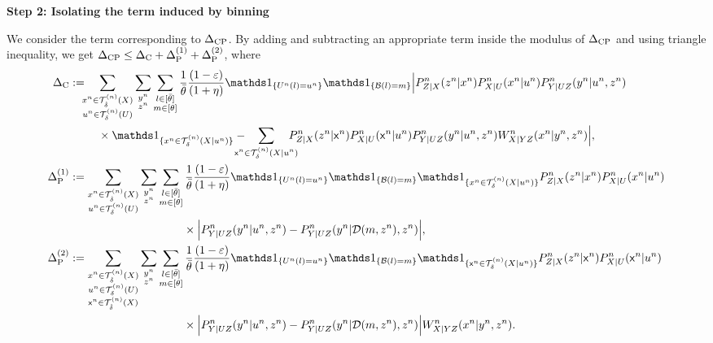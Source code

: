 \noindent \textbf{Step 2: Isolating the term induced by binning}

\noindent We consider the term corresponding to $\Delta_{\text{CP}}$. By adding and subtracting an appropriate term inside the modulus of $\Delta_{\text{CP}}$ and using triangle inequality, we get $\Delta_{\text{CP}} \leq \Delta_{\text{C}} + \Delta_{\text{P}}^{(1)} + \Delta_{\text{P}}^{(2)}$, where 
\begin{align*}
    \ce &\deq \!\!\!\sum_{\substack{\xn \in \Tx \\ \un \in \Tu }} \sum_{\substack{\yn \\ \zn}} \sum_{\substack{ l \in [\btheta]\\m\in [\theta] }} 
    \frac{1}{\btheta} \frac{(1-\varepsilon)}{(1+\eta)} 
    \I_{\set{\Un(l) = \un}} \I_{\set{\calB(l) = m}}
 \Big|P_{Z|X}^n(\zn|\xn) P_{X|U}^n(\xn|\un) P^n_{Y|UZ}(\yn|\un,\zn) \\
    & \hspace{25pt} \times \I_{\set{\xn \in \Txcond}} - \!\!\!\!\!\!\!\sum_{\substack{\sfxn \in \Txcond}} \!\!\!\!\!\!P_{Z|X}^n(\zn|\sfxn) P_{X|U}^n(\sfxn|\un) P^n_{Y|UZ}(\yn|\un,\zn) W^n_{X|YZ}(\xn
    |\yn,\zn)
    \Big|,\\
    \peone &\deq \sum_{\substack{\xn \in \Tx \\ \un \in \Tu }} \sum_{\substack{\yn \\ \zn}} \sum_{\substack{ l \in [\btheta]\\m\in [\theta] }} 
    \frac{1}{\btheta} \frac{(1-\varepsilon)}{(1+\eta)} 
    \I_{\set{\Un(l) = \un}} \I_{\set{\calB(l) = m}} \I_{\set{\xn \in \Txcond}}
    P_{Z|X}^n(\zn|\xn) P_{X|U}^n(\xn|\un) \\
    & \hspace{100pt}  \times \Big| P^n_{Y|UZ}(\yn|\un,\zn) - P^n_{Y|UZ}(\yn|\calD(m,\zn),\zn)\Big|,\\
    \petwo &\deq \sum_{\substack{\xn \in \Tx \\ \un \in \Tu \\ \sfxn \in \Tx}} \sum_{\substack{\yn \\ \zn}} \sum_{\substack{ l \in [\btheta]\\m\in [\theta] }} 
    \frac{1}{\btheta} \frac{(1-\varepsilon)}{(1+\eta)} 
    \I_{\set{\Un(l) = \un}} \I_{\set{\calB(l) = m}} 
    \I_{\set{\sfxn \in \Txcond}}
    P_{Z|X}^n(\zn|\sfxn) P_{X|U}^n(\sfxn|\un) \\
    & \hspace{100pt}  \times \Big| P^n_{Y|UZ}(\yn|\un,\zn) - P^n_{Y|UZ}(\yn|\calD(m,\zn),\zn)\Big| W^n_{X|YZ}(\xn|\yn,\zn).
\end{align*}

